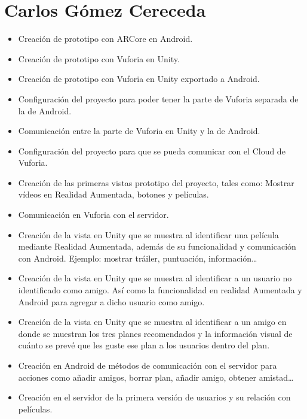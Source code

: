 \section{Carlos Gómez Cereceda}
\label{makereference7.3}
\begin{itemize}  
    \item Creación de prototipo con ARCore en Android.
    \item Creación de prototipo con Vuforia en Unity.
    \item Creación de prototipo con Vuforia en Unity exportado a Android.
    \item Configuración del proyecto para poder tener la parte de Vuforia separada de la de Android.
    \item Comunicación entre la parte de Vuforia en Unity y la de Android.
    \item Configuración del proyecto para que se pueda comunicar con el Cloud de Vuforia.
    \item Creación de las primeras vistas prototipo del proyecto, tales como: Mostrar vídeos en Realidad Aumentada, botones y películas.
    \item Comunicación en Vuforia con el servidor.
    \item Creación de la vista en Unity que se muestra al identificar una película mediante Realidad Aumentada, además de su funcionalidad y comunicación con Android. Ejemplo: mostrar tráiler, puntuación, información…
    \item Creación de la vista en Unity que se muestra al identificar a un usuario no identificado como amigo. Así como la funcionalidad en realidad Aumentada y Android para agregar a dicho usuario como amigo.
    \item Creación de la vista en Unity que se muestra al identificar a un amigo en donde se muestran los tres planes recomendados y la información visual de cuánto se prevé que les guste ese plan a los usuarios dentro del plan.
    \item Creación en Android de métodos de comunicación con el servidor para acciones como añadir amigos, borrar plan, añadir amigo, obtener amistad…
    \item Creación en el servidor de la primera versión de usuarios y su relación con películas.
\end{itemize}

